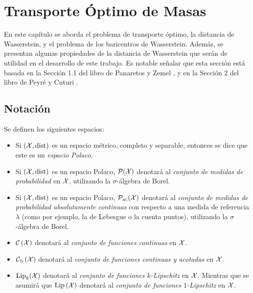 \chapter{Transporte Óptimo de Masas}\label{chap:transporte-optimo-de-masas}  %

En este capítulo se aborda el problema de transporte óptimo, la distancia de Wasserstein, y el problema de los baricentros de Wasserstein. Además, se presentan algunas propiedades de la distancia de Wasserstein que serán de utilidad en el desarrollo de este trabajo.
Es notable señalar que esta sección está basada en la Sección 1.1 del libro de Panaretos y Zemel \cite{panaretos2020invitation}, y en la Sección 2 del libro de Peyré y Cuturi \cite{peyre2019computational}.

\section*{Notación}\label{sec:notacion}  %

\begin{definition}
	Se definen los siguientes espacios:
	\begin{itemize}
		\item Si $(\cX, \dist)$ es un espacio métrico, completo y separable, entonces se dice que este es un \emph{espacio Polaco}.
		\item Si $(\cX, \dist)$ es un espacio Polaco, $\ProbSpace[\cX]$ denotará al \emph{conjunto de medidas de probabilidad} en $\cX$, utilizando la $\sigma$-álgebra de Borel.
		\item Si $(\cX, \dist)$ es un espacio Polaco, $\ProbSpaceAC[\cX]$ denotará al \emph{conjunto de medidas de probabilidad absolutamente continuas} con respecto a una medida de referencia $\lambda$ (como por ejemplo, la de Lebesgue o la cuenta puntos), utilizando la $\sigma$-álgebra de Borel.
		\item $\ContSpace[\cX]$ denotará al \emph{conjunto de funciones continuas} en $\cX$.
		\item $\ContBoundedSpace[\cX]$ denotará al \emph{conjunto de funciones continuas y acotadas} en $\cX$.
		\item ${\Lip}_{k}(\cX)$ denotará al \emph{conjunto de funciones $k$-Lipschitz} en $\cX$. Mientras que se asumirá que $\Lip[\cX]$ denotará al \emph{conjunto de funciones $1$-Lipschitz} en $\cX$. 
	\end{itemize}
\end{definition}


